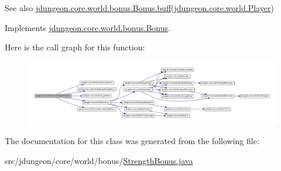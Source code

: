 \begin{DoxySeeAlso}{See also}
\hyperlink{classjdungeon_1_1core_1_1world_1_1bonus_1_1_bonus_a169b5e5d01c584e378c9f043b9bba196}{jdungeon.core.world.bonus.Bonus.buff}(\hyperlink{classjdungeon_1_1core_1_1world_1_1_player}{jdungeon.core.world.Player}) 
\end{DoxySeeAlso}


Implements \hyperlink{classjdungeon_1_1core_1_1world_1_1bonus_1_1_bonus_a169b5e5d01c584e378c9f043b9bba196}{jdungeon.core.world.bonus.Bonus}.



Here is the call graph for this function:
\nopagebreak
\begin{figure}[H]
\begin{center}
\leavevmode
\includegraphics[width=400pt]{classjdungeon_1_1core_1_1world_1_1bonus_1_1_strength_bonus_ad408870aee974a63a4cd9d802a523d35_cgraph}
\end{center}
\end{figure}




The documentation for this class was generated from the following file:\begin{DoxyCompactItemize}
\item 
src/jdungeon/core/world/bonus/\hyperlink{_strength_bonus_8java}{StrengthBonus.java}\end{DoxyCompactItemize}
